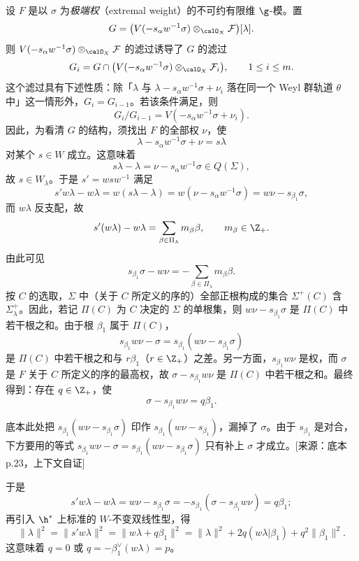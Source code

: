 设 $F$ 是以 $\sigma$ 为\emph{极端权}（extremal weight）的不可约有限维 $\g$-模。置
$$G=\bigl(V(-s_\alpha w^{-1}\sigma)\otimes_{\calO_X}\mathcal{F}\bigr)[\lambda].$$
则 $V(-s_\alpha w^{-1}\sigma)\otimes_{\calO_X}\mathcal{F}$ 的滤过诱导了 $G$ 的滤过
$$G_i=G\cap\bigl(V(-s_\alpha w^{-1}\sigma)\otimes_{\calO_X}\mathcal{F}_i\bigr),\qquad 1\le i\le m.$$
这个滤过具有下述性质：除「$\lambda$ 与 $\lambda-s_\alpha w^{-1}\sigma+\nu_i$ 落在同一个 Weyl 群轨道 $\theta$ 中」这一情形外，$G_i=G_{i-1}$。若该条件满足，则
$$G_i/G_{i-1}=V(-s_\alpha w^{-1}\sigma+\nu_i).$$
因此，为看清 $G$ 的结构，须找出 $F$ 的全部权 $\nu$，使
$$\lambda-s_\alpha w^{-1}\sigma+\nu=s\lambda$$
对某个 $s\in W$ 成立。这意味着
$$s\lambda-\lambda=\nu-s_\alpha w^{-1}\sigma\in Q(\Sigma),$$
故 $s\in W_\lambda$。于是 $s'=wsw^{-1}$ 满足
$$s'w\lambda-w\lambda=w(s\lambda-\lambda)=w(\nu-s_\alpha w^{-1}\sigma)=w\nu-s_{\beta_1}\sigma,$$
而 $w\lambda$ 反支配，故
$$s'(w\lambda)-w\lambda=\sum_{\beta\in\Pi_\lambda}m_\beta\beta,\qquad m_\beta\in\Z_+.$$
由此可见
$$s_{\beta_1}\sigma-w\nu=-\sum_{\beta\in\Pi_\lambda}m_\beta\beta.$$
按 $C$ 的选取，$\Sigma$ 中（关于 $C$ 所定义的序的）全部正根构成的集合 $\Sigma^+(C)$ 含 $\Sigma_\lambda^+$。因此，若记 $\Pi(C)$ 为 $C$ 决定的 $\Sigma$ 的单根集，则 $w\nu-s_{\beta_1}\sigma$ 是 $\Pi(C)$ 中若干根之和。由于根 $\beta_1$ 属于 $\Pi(C)$，
$$s_{\beta_1}w\nu-\sigma=s_{\beta_1}(w\nu-s_{\beta_1}\sigma)$$
是 $\Pi(C)$ 中若干根之和与 $r\beta_1$（$r\in\Z_+$）之差。另一方面，$s_{\beta_1}w\nu$ 是权，而 $\sigma$ 是 $F$ 关于 $C$ 所定义的序的最高权，故 $\sigma-s_{\beta_1}w\nu$ 是 $\Pi(C)$ 中若干根之和。最终得到：存在 $q\in\Z_+$，使
$$\sigma-s_{\beta_1}w\nu=q\beta_1.$$
\begin{annote}
底本此处把 $s_{\beta_1}(w\nu-s_{\beta_1}\sigma)$ 印作 $s_{\beta_1}(w\nu-s_{\beta_1})$，漏掉了 $\sigma$。由于 $s_{\beta_1}$ 是对合，下方要用的等式 $s_{\beta_1}w\nu-\sigma=s_{\beta_1}(w\nu-s_{\beta_1}\sigma)$ 只有补上 $\sigma$ 才成立。[来源：底本 p.23，上下文自证]
\end{annote}
于是
$$s'w\lambda-w\lambda=w\nu-s_{\beta_1}\sigma=-s_{\beta_1}(\sigma-s_{\beta_1}w\nu)=q\beta_1;$$
再引入 $\h^*$ 上标准的 $W$-不变双线性型，得
$$\|\lambda\|^2=\|s'w\lambda\|^2=\|w\lambda+q\beta_1\|^2=\|\lambda\|^2+2q(w\lambda|\beta_1)+q^2\|\beta_1\|^2.$$
这意味着 $q=0$ 或 $q=-\beta_1^\vee(w\lambda)=p$。

